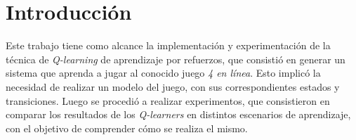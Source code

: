 \section{Introducción}
Este trabajo tiene como alcance la implementaci\'on y experimentaci\'on de la t\'ecnica de  \emph{Q-learning} de aprendizaje por refuerzos, que consisti\'o en generar un sistema que aprenda a jugar al conocido juego \emph{4 en l\'inea}.
Esto implic\'o la necesidad de realizar un modelo del juego, con sus correspondientes estados y transiciones.
Luego se procedi\'o a realizar experimentos, que consistieron en comparar los resultados de los \emph{Q-learners} en distintos escenarios de aprendizaje, con el objetivo de comprender cómo se realiza el mismo.
